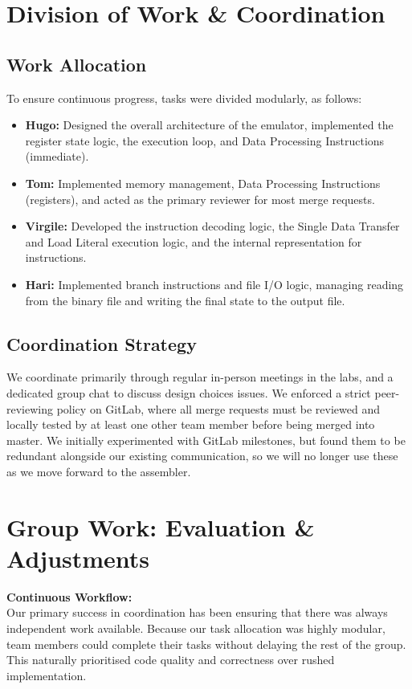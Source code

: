 \documentclass[11pt]{article}
\begin{document}
\section{Division of Work \& Coordination}
\vspace{-0.1cm}
\subsection{Work Allocation}
To ensure continuous progress, tasks were divided modularly, as follows:

\begin{itemize}
  \item \textbf{Hugo:} Designed the overall architecture of the emulator, implemented the register state logic, the execution loop, and Data Processing Instructions (immediate).
  \vspace{-0.1cm}
  \item \textbf{Tom:} Implemented memory management, Data Processing Instructions (registers), and acted as the primary reviewer for most merge requests.
  \vspace{-0.1cm}
  \item \textbf{Virgile:} Developed the instruction decoding logic, the Single Data Transfer and Load Literal execution logic, and the internal representation for instructions.
  \vspace{-0.1cm}
  \item \textbf{Hari:} Implemented branch instructions and file I/O logic, managing reading from the binary file and writing the final state to the output file.
\end{itemize}
\vspace{-0.1cm}
\subsection{Coordination Strategy}
We coordinate primarily through regular in-person meetings in the labs, and a dedicated group chat to discuss design choices issues. We enforced a strict peer-reviewing policy on GitLab, where all merge requests must be reviewed and locally tested by at least one other team member before being merged into master. We initially experimented with GitLab milestones, but found them to be redundant alongside our existing communication, so we will no longer use these as we move forward to the assembler.

\vspace{-0.1cm}
\section{Group Work: Evaluation \& Adjustments}
\vspace{-0.1cm}
\noindent\textbf{Continuous Workflow:}\\
Our primary success in coordination has been ensuring that there was always independent work available. Because our task allocation was highly modular, team members could complete their tasks without delaying the rest of the group. This naturally prioritised code quality and correctness over rushed implementation.
\end{document}
